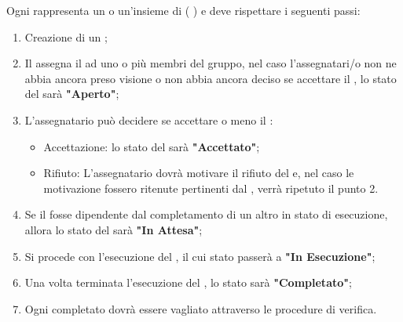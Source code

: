 \documentclass[12pt,a4paper]{article}
\begin{document}
\label{ticketCicloVita}
Ogni  rappresenta un  o un'insieme di  ( ) e deve rispettare i seguenti passi:
\begin{enumerate}
	\item Creazione di un ;
	\item Il \PM{} assegna il  ad uno o più membri del gruppo, nel caso l'assegnatari/o non ne abbia ancora preso visione o non abbia ancora deciso se accettare il , lo stato del  sarà \textbf{"Aperto"};
	\item L'assegnatario può decidere se accettare o meno il :
	\begin{itemize}
		\item Accettazione: lo stato del  sarà \textbf{"Accettato"};
		\item Rifiuto: L'assegnatario dovrà motivare il rifiuto del  e, nel caso le motivazione fossero ritenute pertinenti dal \PM{}, verrà ripetuto il punto 2.
	\end{itemize}
	\item Se il  fosse dipendente dal completamento di un altro  in stato di esecuzione, allora lo stato del  sarà \textbf{"In Attesa"};
	\item Si procede con l'esecuzione del , il cui stato passerà a \textbf{"In Esecuzione"};
	\item Una volta terminata l'esecuzione del , lo stato sarà \textbf{"Completato"};
	\item Ogni  completato dovrà essere vagliato attraverso le procedure di verifica.
\end{enumerate}
\end{document}

